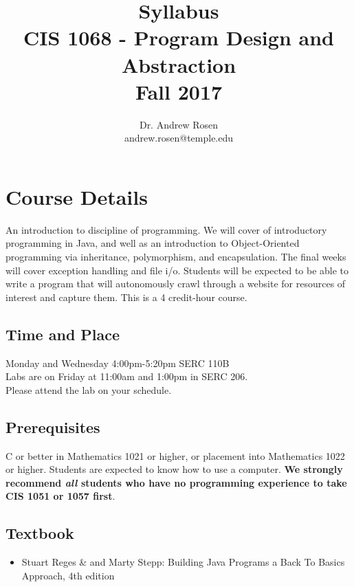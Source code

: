\documentclass[10pt, letter]{article}
\title{Syllabus \\ CIS 1068 - Program Design and Abstraction  \\ Fall 2017}
\author{Dr. Andrew Rosen  \\ andrew.rosen@temple.edu}
\date{}
\begin{document}
\maketitle

\section{Course Details}

An introduction to discipline of programming.  We will cover of introductory programming in Java, and well as an introduction to Object-Oriented programming via inheritance, polymorphism, and encapsulation.  The final weeks will cover exception handling and file i/o.
Students will be expected to be able to write a program that will autonomously crawl through a website for resources of interest and capture them.
This is a 4 credit-hour course.




\subsection*{Time and Place}
Monday and Wednesday 4:00pm-5:20pm SERC 110B
\\
Labs are on Friday at 11:00am and 1:00pm in SERC 206.
\\
Please attend the lab on your schedule.


\subsection*{Prerequisites}
C or better in Mathematics 1021 or higher, or placement into Mathematics 1022 or higher. 
Students are expected to know how to use a computer.
\textbf{We strongly recommend \textit{all} students who have no programming experience to take CIS 1051 or 1057 first}.




\subsection*{Textbook}
\begin{itemize}
	\item Stuart Reges \& and Marty Stepp: Building Java Programs a Back To Basics Approach, 4th edition
\end{itemize}
\end{document}
